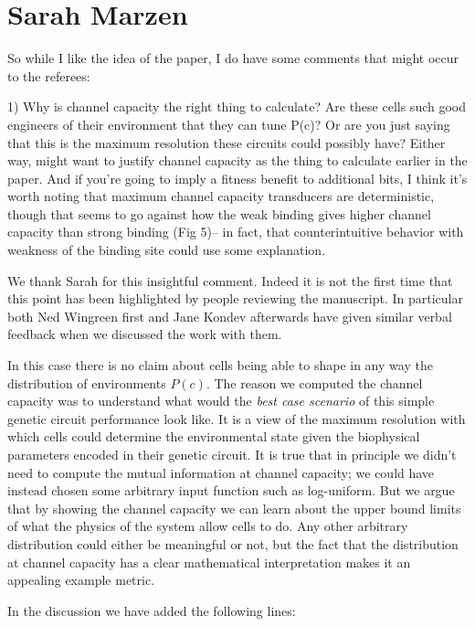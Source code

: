 \section{Sarah Marzen}

So while I like the idea of the paper, I do have some comments that might occur
to the referees:

\begin{tcolorbox}
1)  Why is channel capacity the right thing to calculate?  Are these cells such
good engineers of their environment that they can tune P(c)?  Or are you just
saying that this is the maximum resolution these circuits could possibly have?
Either way, might want to justify channel capacity as the thing to calculate
earlier in the paper.  And if you're going to imply a fitness benefit to
additional bits, I think it's worth noting that maximum channel capacity
transducers are deterministic, though that seems to go against how the weak
binding gives higher channel capacity than strong binding (Fig 5)-- in fact,
that counterintuitive behavior with weakness of the binding site could use some
explanation.
\end{tcolorbox}
We thank Sarah for this insightful comment. Indeed it is not the first time that
this point has been highlighted by people reviewing the manuscript. In
particular both Ned Wingreen first and Jane Kondev afterwards have given similar
verbal feedback when we discussed the work with them.

In this case there is no claim about cells being able to shape in any way the
distribution of environments $P(c)$. The reason we computed the channel
capacity was to understand what would the \textit{best case scenario} of this
simple genetic circuit performance look like. It is a view of the maximum
resolution with which cells could determine the environmental state given the
biophysical parameters encoded in their genetic circuit. It is true that in
principle we didn't need to compute the mutual information at channel capacity;
we could have instead chosen some arbitrary input function such as log-uniform.
But we argue that by showing the channel capacity we can learn about the upper
bound limits of what the physics of the system allow cells to do. Any other
arbitrary distribution could either be meaningful or not, but the fact that the
distribution at channel capacity has a clear mathematical interpretation
makes it an appealing example metric.

In the discussion we have added the following lines:

